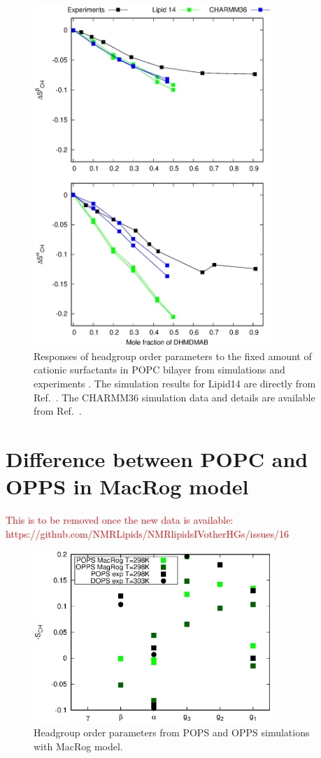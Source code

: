 \documentclass[journal=jpcbfk]{achemso}
\newcommand{\todo}[1]{\textcolor{red}{#1}}
\begin{document}
\begin{figure}[]
  \centering
  \includegraphics[width=9.0cm]{../Figs/HGopsDHMDMAB.eps}
  \caption{\label{CHANGESwithDHMDMAB}
  Responses of headgroup order parameters to the fixed amount of cationic surfactants in
  POPC bilayer from simulations and experiments \cite{scherer89}.
  The simulation results for Lipid14 are directly from Ref.~.
  The CHARMM36 simulation data and details are available from Ref.~.
}
\end{figure}

\pagebreak
\section{Difference between POPC and OPPS in MacRog model}

\todo{This is to be removed once the new data is available: \\
https://github.com/NMRLipids/NMRlipidsIVotherHGs/issues/16}

\begin{figure}[]
  \centering
  \includegraphics[width=9.0cm]{../Figs/HGorderparametersPOPSvsOPPS.eps}
  \caption{\label{CHANGESwithCaClPGPS}
    Headgroup order parameters from POPS and OPPS simulations with MacRog model.}
\end{figure}
\end{document}
